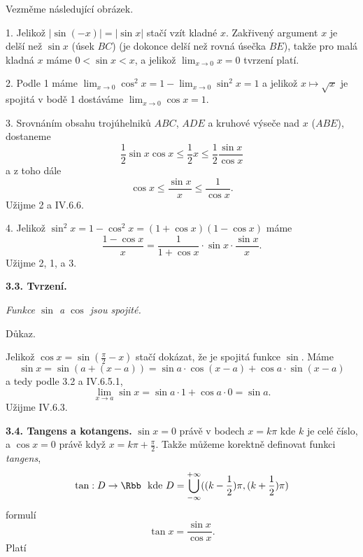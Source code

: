 \documentclass[12pt]{article}
\begin{document}
{Vezměme následující obrázek.


\medskip
 \centerline{
}

\vskip10mm

1. Jelikož $|\sin(-x)|=|\sin x|$ stačí vzít kladné  $x$. Zakřivený argument $x$ je delší než $\sin x$ (úsek $BC$) (je dokonce delší než rovná úsečka $BE$), takže pro malá kladná  $x$ máme
$0<\sin x< x$, a jelikož $\lim_{x\to 0}x=0$ tvrzení platí.

\smallskip
 
 2. Podle 1 máme $\lim_{x\to 0}\cos^2x=1-\lim_{x\to 0}\sin^2x=1$ a  jelikož
 $x\mapsto\sqrt x$ je spojitá v bodě 1 dostáváme $\lim_{x\to 0}\cos x=1$.
 
 \smallskip
 
 3. Srovnáním obsahu trojúhelniků $ABC$, $ADE$ a kruhové výseče nad $x$ ($ABE$), dostaneme
 $$
 \frac12\sin x\cos x\leq \frac12 x\leq \frac12\frac{\sin x}{\cos x}
 $$
 a z toho dále
 $$
 \cos x\leq \frac{\sin x}{x}\leq\frac{1}{\cos x}.
 $$
 Užijme 2 a IV.6.6.
 
 \smallskip
 
 4. Jelikož $\sin^2x=1-\cos^2x=(1+\cos x)(1-\cos x)$ máme
 $$
 \frac{1-\cos x}{x}=\frac{1}{1+\cos x}\cdot\sin x\cdot \frac{\sin x}{x}.
 $$
 Užijme 2, 1, a 3. \sq
 
 \bigskip
 
 {\bf 3.3. Tvrzení.} {\em Funkce $\sin$ a $\cos$ jsou spojité.
 
 Důkaz.} Jelikož $\cos x=\sin(\frac{\pi}{2}-x)$ stačí dokázat, že je spojitá funkce $\sin$.  Máme
 $$
 \sin x=\sin(a+(x-a))=\sin a\cdot\cos(x-a)+\cos a\cdot\sin(x-a)
 $$
 a tedy podle 3.2 a IV.6.5.1,
 $$
 \lim_{x\to a}\sin x= \sin a\cdot 1 + \cos a\cdot 0=\sin a.
 $$
 Užijme IV.6.3.  \sq
 
 \bigskip
 
 {\bf 3.4. Tangens a kotangens.}  $\sin x= 0$ právě v bodech $x=k\pi$ kde  $k$ je celé číslo, a $\cos x= 0$ právě 
když $x=k\pi+\frac{\pi}{2}$. Takže můžeme korektně definovat funkci  {\em tangens},
 $$
 \tan:D\to\Rbb\  \ \text{kde}\ D=\bigcup_{-\infty}^{+\infty}((k-\frac12)\pi,(k+\frac12)\pi)
 $$
 formulí
 $$
 \tan x=\frac{\sin x}{\cos x}.
 $$
Platí
 
}
\end{document}
